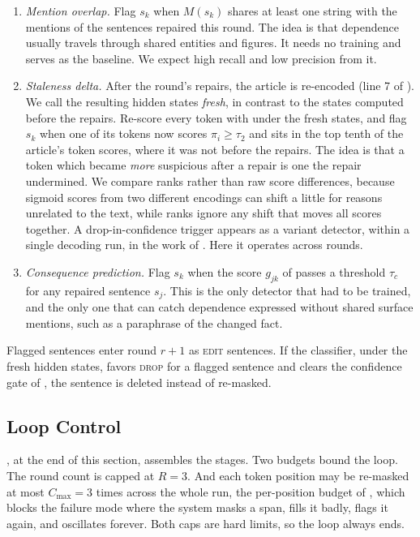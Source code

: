 \documentclass[]{paper}
\newcommand{\edit}{\textsc{edit}}
\newcommand{\drop}{\textsc{drop}}
\begin{document}
\begin{enumerate}
\item[(a)] \emph{Mention overlap.} Flag $s_k$ when $M(s_k)$ shares at least one string with the mentions of the sentences repaired this round. The idea is that dependence usually travels through shared entities and figures. It needs no training and serves as the baseline. We expect high recall and low precision from it.
\item[(b)] \emph{Staleness delta.} After the round's repairs, the article is re-encoded (line 7 of ). We call the resulting hidden states \emph{fresh}, in contrast to the states computed before the repairs. Re-score every token with  under the fresh states, and flag $s_k$ when one of its tokens now scores $\pi_i \ge \tau_2$ and sits in the top tenth of the article's token scores, where it was not before the repairs. The idea is that a token which became \emph{more} suspicious after a repair is one the repair undermined. We compare ranks rather than raw score differences, because sigmoid scores from two different encodings can shift a little for reasons unrelated to the text, while ranks ignore any shift that moves all scores together. A drop-in-confidence trigger appears as a variant detector, within a single decoding run, in the work of \citet{yao-2026-remask}. Here it operates across rounds.
\item[(c)] \emph{Consequence prediction.} Flag $s_k$ when the score $g_{jk}$ of  passes a threshold $\tau_c$ for any repaired sentence $s_j$. This is the only detector that had to be trained, and the only one that can catch dependence expressed without shared surface mentions, such as a paraphrase of the changed fact.
\end{enumerate}

Flagged sentences enter round $r+1$ as \edit{} sentences. If the classifier, under the fresh hidden states, favors \drop{} for a flagged sentence and clears the confidence gate of , the sentence is deleted instead of re-masked.

\subsection{Loop Control}
\label{sec:loop}

, at the end of this section, assembles the stages. Two budgets bound the loop. The round count is capped at $R = 3$. And each token position may be re-masked at most $C_{\max} = 3$ times across the whole run, the per-position budget of \citet{yao-2026-remask}, which blocks the failure mode where the system masks a span, fills it badly, flags it again, and oscillates forever. Both caps are hard limits, so the loop always ends.
\end{document}
